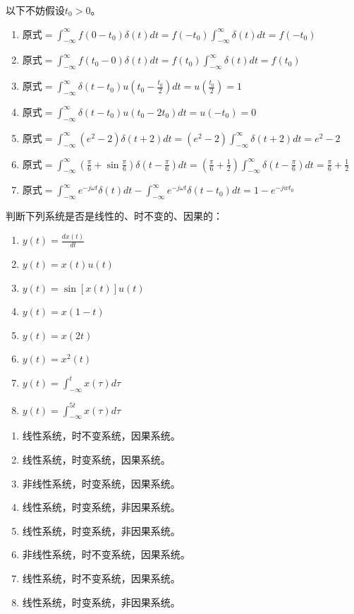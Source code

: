 \documentclass[answers]{exam}  %
\begin{document}
\begin{questions}
\begin{solution}
	以下不妨假设$t_0>0$。
	\begin{enumerate}[(1)]
		\item 原式$=\int_{-\infty}^{\infty} f(0-t_0)\delta(t) dt=
		       f(-t_0)\int_{-\infty}^{\infty} \delta(t) dt=f(-t_0)$
		\item 原式$=\int_{-\infty}^{\infty} f(t_0-0)\delta(t) dt=
		      f(t_0)\int_{-\infty}^{\infty} \delta(t) dt=f(t_0)$
		\item 原式$=\int_{-\infty}^{\infty} \delta(t-t_0)u(t_0-\frac{t_0}{2}) dt=u(\frac{t_0}{2})=1$
		\item 原式$=\int_{-\infty}^{\infty} \delta(t-t_0)u(t_0-2t_0) dt=u(-t_0)=0$
		\item 原式$=\int_{-\infty}^{\infty} (e^{2}-2)\delta(t+2) dt=
		      (e^{2}-2)\int_{-\infty}^{\infty} \delta(t+2) dt=e^{2}-2$
		\item 原式$=\int_{-\infty}^{\infty} (\frac{\pi}{6}+\sin
		\frac{\pi}{6})\delta(t-\frac{\pi}{6})       dt=(\frac{\pi}{6}+\frac{1}{2})\int_{-\infty}^{\infty}\delta(t-\frac{\pi}{6})  dt=\frac{\pi}{6}+\frac{1}{2}$
		\item 原式$=\int_{-\infty}^{\infty} e^{-j\omega t} \delta(t) dt -
		\int_{-\infty}^{\infty} e^{-j\omega t}\delta(t-t_0)dt=1-e^{-jwt_0}$
	\end{enumerate}
\end{solution}


\question 判断下列系统是否是线性的、时不变的、因果的：
\begin{enumerate}[(1)]
	\item $y(t) = \frac{d x(t)}{dt}$
	\item $y(t) = x(t)u(t)$
	\item $y(t) = \sin \left[x(t)\right]u(t)$
	\item $y(t) = x(1-t)$
	\item $y(t) = x(2t)$
	\item $y(t) = x^2(t)$
	\item $y(t) = \int_{-\infty}^t x(\tau) d\tau$
	\item $y(t) = \int_{-\infty}^{5t} x(\tau) d\tau$
\end{enumerate}

\begin{solution}
	\begin{enumerate}[(1)]
		\item 线性系统，时不变系统，因果系统。
		\item 线性系统，时变系统，因果系统。
		\item 非线性系统，时变系统，因果系统。
		\item 线性系统，时变系统，非因果系统。
		\item 线性系统，时变系统，非因果系统。
		\item 非线性系统，时不变系统，因果系统。
		\item 线性系统，时不变系统，因果系统。
		\item 线性系统，时变系统，非因果系统。
	\end{enumerate}
\end{solution}



\end{questions}
\end{document}
